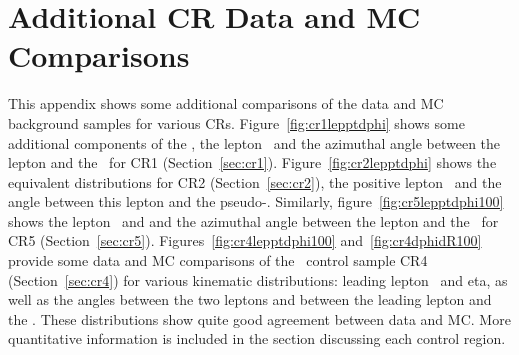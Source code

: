 \section{Additional CR Data and MC Comparisons} 
\label{app:ttdlnj}

This appendix shows some additional comparisons of the data and MC background samples
for various CRs. Figure~\ref{fig:cr1lepptdphi} shows some
additional components of the \mt, the lepton \pt\ and the
azimuthal angle between the lepton and the \met\ for CR1
(Section~\ref{sec:cr1}). Figure~\ref{fig:cr2lepptdphi} shows the
equivalent distributions for CR2 (Section~\ref{sec:cr2}), the positive lepton \pt\ and the
angle between this lepton and the
pseudo-\met. Similarly, figure~\ref{fig:cr5lepptdphi100} shows the lepton
\pt\ and and the azimuthal angle between the lepton and the \met\ for CR5
(Section~\ref{sec:cr5}). Figures~\ref{fig:cr4lepptdphi100}
and~\ref{fig:cr4dphidR100} provide some data and MC comparisons of the
\ttdl\ control sample CR4 (Section~\ref{sec:cr4}) for various
kinematic distributions: leading lepton \pt\ and eta, as well as the
angles between the two leptons and between the leading lepton and the
\met. These distributions show quite good agreement between data and
MC. More quantitative information is included in the section discussing each
control region.

